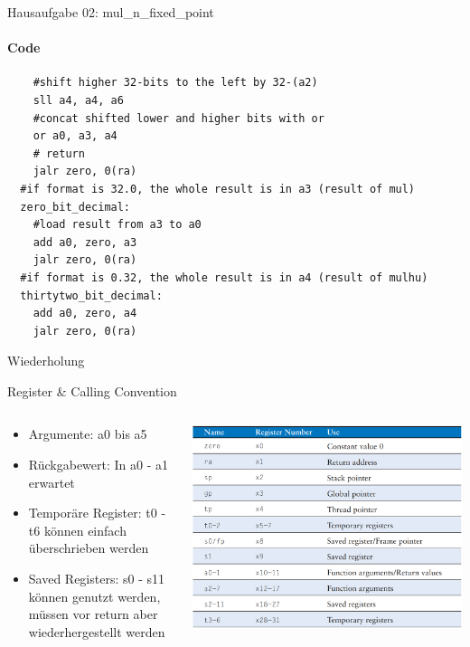 \documentclass[
  german,            %
  aspectratio=169,    %
]{tumbeamer}
\begin{document}
\begin{frame}[fragile]{Hausaufgabe 02: mul\_n\_fixed\_point}
  \framesubtitle{Code}
  \begin{lstlisting}
    #shift higher 32-bits to the left by 32-(a2)
    sll a4, a4, a6
    #concat shifted lower and higher bits with or
    or a0, a3, a4
    # return
    jalr zero, 0(ra)
  #if format is 32.0, the whole result is in a3 (result of mul)
  zero_bit_decimal:
    #load result from a3 to a0
    add a0, zero, a3
    jalr zero, 0(ra)
  #if format is 0.32, the whole result is in a4 (result of mulhu)
  thirtytwo_bit_decimal:
    add a0, zero, a4
    jalr zero, 0(ra)
  \end{lstlisting}
\end{frame}

\begin{frame}[c]{}{}
  \begin{center}
    \LARGE  Wiederholung
  \end{center}
\end{frame}

\begin{frame}[c]{Register \& Calling Convention}{}
  \begin{columns}[c]
    \begin{column}{0.5\textwidth}
      \begin{itemize}
        \item Argumente: a0 bis a5
        \item Rückgabewert: In a0 - a1 erwartet
        \item Temporäre Register: t0 - t6 können einfach überschrieben werden
        \item Saved Registers: s0 - s11 können genutzt werden, müssen vor return aber wiederhergestellt werden
      \end{itemize}
    \end{column}
    \begin{column}{0.5\textwidth}
      \includegraphics[width=\linewidth]{riscv_registers.png}
    \end{column}
  \end{columns}
\end{frame}
\end{document}
